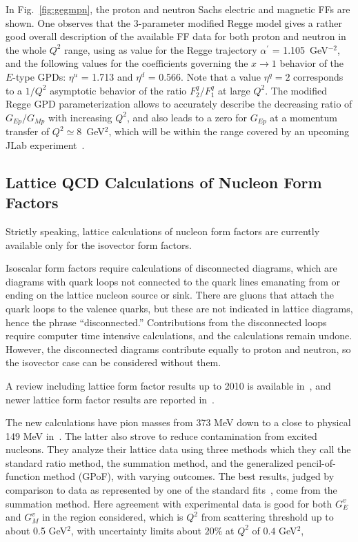 
In Fig.~\ref{fig:gegmpn}, the proton and neutron Sachs electric 
and magnetic FFs are shown. 
One observes that the 3-parameter 
modified Regge model gives a rather good overall 
description of the available FF data for both proton and neutron 
in the whole $Q^2$ range,   
using as value for the Regge trajectory 
$\alpha^\prime $ = 1.105 \,GeV$^{-2}$, 
and the following values for the coefficients 
governing the $x \to 1$ behavior of the $E$-type GPDs:  
$\eta^u$ = 1.713 and $\eta^d$ = 0.566.  
Note that a value $\eta^q = 2$ 
corresponds to a $ 1/Q^2$ asymptotic behavior of the ratio
$F_2^q / F_1^q$ at large $Q^2$. 
The modified Regge GPD parameterization allows 
to accurately describe the decreasing ratio of $G_{E p} / G_{M p}$ 
with increasing $Q^2$, and 
also leads to a zero for $G_{E p}$ at a 
momentum transfer of $Q^2 \simeq 8$~GeV$^2$, which will be within the range 
covered by an upcoming JLab experiment~\cite{E-04-108}. 





\subsection{Lattice QCD Calculations of Nucleon Form Factors}
\label{subsec:lattice}

Strictly speaking, lattice calculations of nucleon form factors are currently available only for the isovector form factors.  

Isoscalar form factors require calculations of disconnected diagrams, which are diagrams with quark loops not connected to the quark lines emanating from or ending on the lattice nucleon source or sink.  There are gluons that attach the quark loops to the valence quarks, but these are not indicated in lattice diagrams, hence the phrase ``disconnected.''  Contributions from the disconnected loops require computer time intensive calculations, and the calculations remain undone.  However, the disconnected diagrams contribute equally to proton and neutron, so the isovector case can be considered without them.  

A review including lattice form factor results up to 2010 is available in~\cite{Hagler:2009ni}, and newer lattice form factor results are reported in~\cite{Alexandrou:2013joa,Bhattacharya:2013ehc,Green:2014xba}.


The new calculations have pion masses from 373 MeV down to a close to physical 149 MeV in~\cite{Green:2014xba}.  The latter also strove to reduce contamination from excited nucleons.  They analyze their lattice data using three methods which they call the standard ratio method, the summation method, and the generalized pencil-of-function method (GPoF), with varying outcomes.  The best results, judged by comparison to data as represented by one of the standard fits~\cite{Alberico:2008sz}, come from the summation method.  Here agreement with experimental data is good for both $G_E^v$ and $G_M^v$ in the region considered, which is $Q^2$ from scattering threshold up to about 0.5 GeV$^2$, with uncertainty limits about $20\%$ at $Q^2$ of $0.4$ GeV$^2$,

